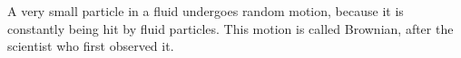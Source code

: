 A very small particle in a fluid undergoes random motion, because
it is constantly being hit by fluid particles. This motion is called
Brownian, after the scientist who first observed it.
